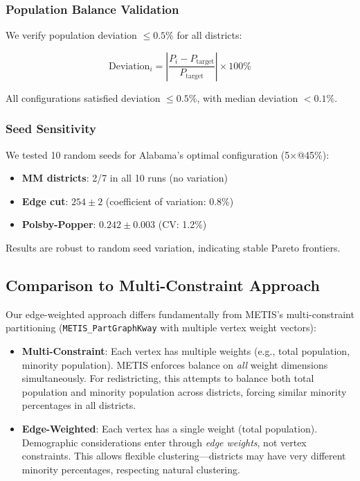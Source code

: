 \subsubsection{Population Balance Validation}

We verify population deviation $\leq 0.5\%$ for all districts:

\[
\text{Deviation}_i = \left| \frac{P_i - P_{\text{target}}}{P_{\text{target}}} \right| \times 100\%
\]

All configurations satisfied deviation $\leq 0.5\%$, with median deviation $< 0.1\%$.

\subsubsection{Seed Sensitivity}

We tested 10 random seeds for Alabama's optimal configuration (5×@45\%):
\begin{itemize}
    \item \textbf{MM districts}: 2/7 in all 10 runs (no variation)
    \item \textbf{Edge cut}: $254 \pm 2$ (coefficient of variation: 0.8\%)
    \item \textbf{Polsby-Popper}: $0.242 \pm 0.003$ (CV: 1.2\%)
\end{itemize}

Results are robust to random seed variation, indicating stable Pareto frontiers.

\subsection{Comparison to Multi-Constraint Approach}

Our edge-weighted approach differs fundamentally from METIS's multi-constraint partitioning (\texttt{METIS\_PartGraphKway} with multiple vertex weight vectors):

\begin{itemize}
    \item \textbf{Multi-Constraint}: Each vertex has multiple weights (e.g., total population, minority population). METIS enforces balance on \emph{all} weight dimensions simultaneously. For redistricting, this attempts to balance both total population and minority population across districts, forcing similar minority percentages in all districts.
    \item \textbf{Edge-Weighted}: Each vertex has a single weight (total population). Demographic considerations enter through \emph{edge weights}, not vertex constraints. This allows flexible clustering---districts may have very different minority percentages, respecting natural clustering.
\end{itemize}

